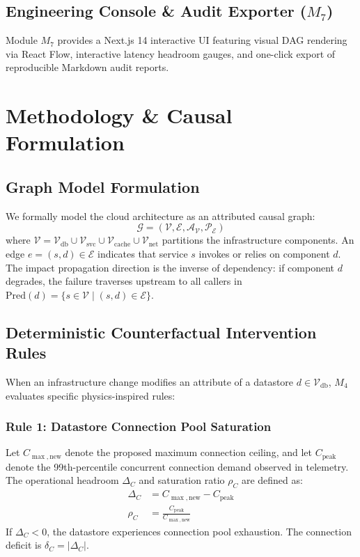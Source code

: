 \documentclass[conference]{IEEEtran}
\begin{document}
\subsection{Engineering Console \& Audit Exporter ($M_7$)}
Module $M_7$ provides a Next.js 14 interactive UI featuring visual DAG rendering via React Flow, interactive latency headroom gauges, and one-click export of reproducible Markdown audit reports.

\section{Methodology \& Causal Formulation}
\subsection{Graph Model Formulation}
We formally model the cloud architecture as an attributed causal graph:
\begin{equation}
\mathcal{G} = (\mathcal{V}, \mathcal{E}, \mathcal{A}_{\mathcal{V}}, \mathcal{P}_{\mathcal{E}})
\end{equation}
where $\mathcal{V} = \mathcal{V}_{\text{db}} \cup \mathcal{V}_{\text{svc}} \cup \mathcal{V}_{\text{cache}} \cup \mathcal{V}_{\text{net}}$ partitions the infrastructure components. An edge $e = (s, d) \in \mathcal{E}$ indicates that service $s$ invokes or relies on component $d$. The impact propagation direction is the inverse of dependency: if component $d$ degrades, the failure traverses upstream to all callers in $\text{Pred}(d) = \{s \in \mathcal{V} \mid (s, d) \in \mathcal{E}\}$.

\subsection{Deterministic Counterfactual Intervention Rules}
When an infrastructure change modifies an attribute of a datastore $d \in \mathcal{V}_{\text{db}}$, $M_4$ evaluates specific physics-inspired rules:

\subsubsection{Rule 1: Datastore Connection Pool Saturation}
Let $C_{\max,\text{new}}$ denote the proposed maximum connection ceiling, and let $C_{\text{peak}}$ denote the 99th-percentile concurrent connection demand observed in telemetry. The operational headroom $\Delta_C$ and saturation ratio $\rho_C$ are defined as:
\begin{align}
\Delta_C &= C_{\max,\text{new}} - C_{\text{peak}} \label{eq:headroom} \\
\rho_C &= \frac{C_{\text{peak}}}{C_{\max,\text{new}}} \label{eq:saturation}
\end{align}
If $\Delta_C < 0$, the datastore experiences connection pool exhaustion. The connection deficit is $\delta_C = |\Delta_C|$.
\end{document}
